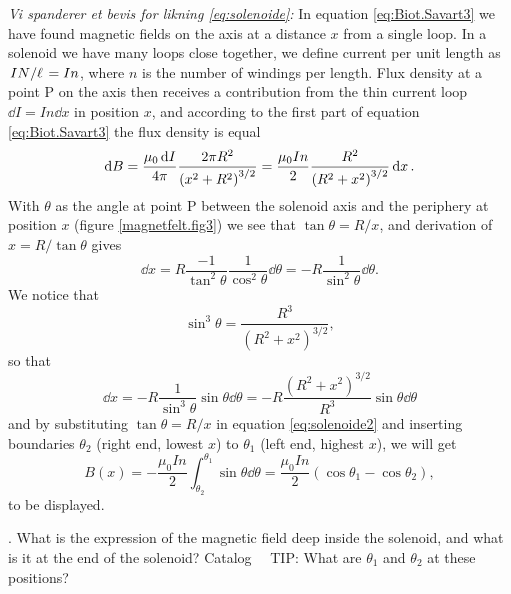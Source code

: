 \documentclass[../Elmag-labhefte-2020.tex]{subfiles}
\begin{document}
\emph{Vi spanderer et bevis for likning \eqref{eq:solenoide}:} In equation \eqref{eq:Biot.Savart3} we have found magnetic fields on the axis at a distance $x$ from a single loop. In a solenoid we have many loops close together, we define current per unit length as $\flatfrac{I N}{\ell} = I n$, where $n$ is the number of windings per length. Flux density at a point P on the axis then receives a contribution from the thin current loop $\dd{I} = I n \dd{x}$ in position $x$, and according to the first part of equation \eqref{eq:Biot.Savart3} the flux density is equal
\begin{equation}
    \dd B 
        = \frac{\mu_0 \dd{I}}{4 \pi} \frac{2\pi R^2}{\qty(x^2 + R^2)^{3/2}}
        = \frac{\mu_0 I n}{2}  \frac{R^2}{ \qty( R^2 + x^2)^{3/2}} \dd{x} .
    \label{eq:solenoide2}
\end{equation}
%
With $\theta$ as the angle at point P between the solenoid axis and the periphery at position $x$ (figure \ref{magnetfelt.fig3}) we see that $\tan \theta = R / x$, and derivation of $x = R / \tan \theta$ gives
\begin{equation}
    \dd{x} 
        = R \frac{-1}{\tan^2 \theta} \frac{1}{\cos^2\theta} \dd{\theta} 
        = -R \frac{1}{\sin^2\theta} \dd{\theta} .
\end{equation}
%
We notice that
\begin{equation}
    \sin^3 \theta = \frac{R^3}{(R^2 + x^2)^{3/2}},
\end{equation}
so that
\begin{equation}
    \dd{x} 
        = -R \frac{1}{\sin^3\theta} \sin\theta \dd{\theta}
        = -R \frac{(R^2 + x^2)^{3/2}}{R^3} \sin\theta \dd{\theta}
\end{equation}
and by substituting $\tan \theta = R / x$ in equation \eqref{eq:solenoide2} and inserting boundaries $\theta_2$ (right end, lowest $x$) to $\theta_1$ (left end, highest $x$), we will get
%
\begin{equation}
    B(x) 
        = -\frac{\mu_0 I n}{2} \int_{\theta_2}^{\theta_1} \sin \theta \dd{\theta}
        = \frac{\mu_0 I n}{2} (\cos \theta_1 - \cos \theta_2),
    \label{eq:solenoide3}
\end{equation}
to be displayed.

{. What is the expression of the magnetic field deep inside the solenoid, and what is it at the end of the solenoid?}
Catalog \ \
TIP: What are $\theta_1$ and $\theta_2$ at these positions?
\end{document}
